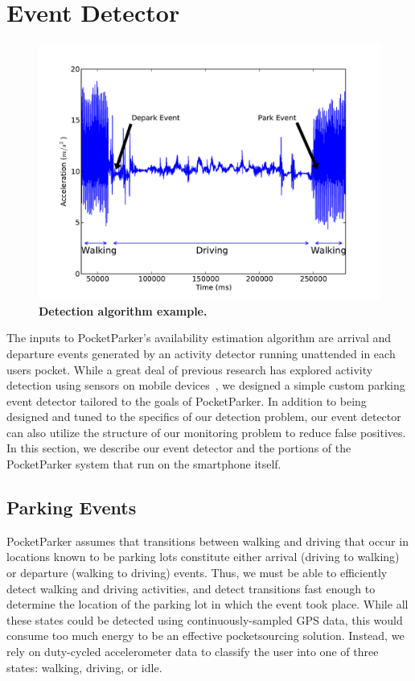 \section{Event Detector}
\label{sec-detector}

\begin{figure}
\centering
\includegraphics[width=\columnwidth]{./figures/Detection.pdf}

\caption{\textbf{Detection algorithm example.} }

\label{fig-camera}
\end{figure}

The inputs to PocketParker's availability estimation algorithm are arrival
and departure events generated by an activity detector running unattended in
each users pocket. While a great deal of previous research has explored
activity detection using sensors on mobile devices~\cite{FIXME}, we designed a
simple custom parking event detector tailored to the goals of PocketParker.
In addition to being designed and tuned to the specifics of our detection
problem, our event detector can also utilize the structure of our monitoring
problem to reduce false positives. In this section, we describe our event
detector and the portions of the PocketParker system that run on the
smartphone itself.

\subsection{Parking Events}
\label{subsec-goals}

PocketParker assumes that transitions between walking and driving that occur
in locations known to be parking lots constitute either arrival (driving to
walking) or departure (walking to driving) events. Thus, we must be able to
efficiently detect walking and driving activities, and detect transitions
fast enough to determine the location of the parking lot in which the event
took place. While all these states could be detected using
continuously-sampled GPS data, this would consume too much energy to be an
effective pocketsourcing solution. Instead, we rely on duty-cycled
accelerometer data to classify the user into one of three states: walking,
driving, or idle.

